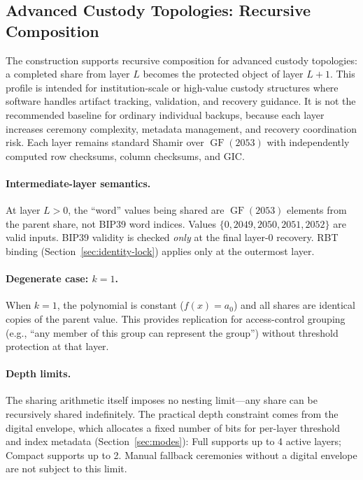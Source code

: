 \documentclass[11pt]{article}
\newcommand{\GF}{\operatorname{GF}}
\begin{document}
\subsection{Advanced Custody Topologies: Recursive Composition}
\label{sec:nesting}

The construction supports recursive composition for advanced custody topologies: a completed share from layer $L$ becomes the protected object of layer $L+1$. This profile is intended for institution-scale or high-value custody structures where software handles artifact tracking, validation, and recovery guidance. It is not the recommended baseline for ordinary individual backups, because each layer increases ceremony complexity, metadata management, and recovery coordination risk. Each layer remains standard Shamir over $\GF(2053)$ with independently computed row checksums, column checksums, and GIC.

\paragraph{Intermediate-layer semantics.} At layer $L > 0$, the ``word'' values being shared are $\GF(2053)$ elements from the parent share, not BIP39 word indices. Values $\{0, 2049, 2050, 2051, 2052\}$ are valid inputs. BIP39 validity is checked \emph{only} at the final layer-0 recovery. RBT binding (Section~\ref{sec:identity-lock}) applies only at the outermost layer.

\paragraph{Degenerate case: $k = 1$.} When $k = 1$, the polynomial is constant ($f(x) = a_0$) and all shares are identical copies of the parent value. This provides replication for access-control grouping (e.g., ``any member of this group can represent the group'') without threshold protection at that layer.

\paragraph{Depth limits.} The sharing arithmetic itself imposes no nesting limit---any share can be recursively shared indefinitely. The practical depth constraint comes from the digital envelope, which allocates a fixed number of bits for per-layer threshold and index metadata (Section~\ref{sec:modes}): Full supports up to 4 active layers; Compact supports up to 2. Manual fallback ceremonies without a digital envelope are not subject to this limit.
\end{document}
